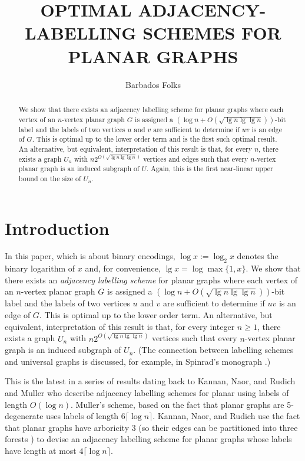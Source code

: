 \documentclass[kpfonts]{patmorin}
\title{\MakeUppercase{Optimal Adjacency-Labelling Schemes for Planar Graphs}}
\author{Barbados Folks}
\begin{document}
\begin{titlepage}
\maketitle

\begin{abstract}
  We show that there exists an adjacency labelling scheme for planar graphs where each vertex of an $n$-vertex planar graph $G$ is assigned a $(\log n+O(\sqrt{\lg n\lg\lg n}))$-bit label and the labels of two vertices $u$ and $v$ are sufficient to determine if $uv$ is an edge of $G$.  This is optimal up to the lower order term and is the first such optimal result.  An alternative, but equivalent, interpretation of this result is that, for every $n$, there exists a graph $U_n$ with $n2^{O(\sqrt{\lg n\lg\lg n})}$ vertices and edges such that every $n$-vertex planar graph is an induced subgraph of $U$.  Again, this is the first near-linear upper bound on the size of $U_n$.
\end{abstract}
\end{titlepage}
\tableofcontents

\newpage

\setcounter{page}{0}
\section{Introduction}

In this paper, which is about binary encodings, $\log x:=\log_2 x$ denotes the binary logarithm of $x$ and, for convenience, $\lg x = \log\max\{1,x\}$.  We show that there exists an \emph{adjacency labelling scheme} for planar graphs where each vertex of an $n$-vertex planar graph $G$ is assigned a $(\log n+O(\sqrt{\lg n\lg\lg n}))$-bit label and the labels of two vertices $u$ and $v$ are sufficient to determine if $uv$ is an edge of $G$.  This is optimal up to the lower order term.  An alternative, but equivalent, interpretation of this result is that, for every integer $n\ge 1$, there exists a graph $U_n$ with $n2^{O(\sqrt{\lg n\lg\lg n})}$ vertices such that every $n$-vertex planar graph is an induced subgraph of $U_n$.  (The connection between labelling schemes and universal graphs is discussed, for example, in Spinrad's monograph \cite[Section~2.1]{spinrad:efficient}.) 

This is the latest in a series of results dating back to Kannan, Naor, and Rudich \cite{kannan.naor.ea:implicit0,kannan.naor.ea:implicit} and Muller \cite{muller:local} who describe adjacency labelling schemes for planar using labels of length $O(\log n)$.  Muller's scheme, based on the fact that planar graphs are 5-degenerate uses labels of length $6\lceil\log n\rceil$.  Kannan, Naor, and Rudich use the fact that planar graphs have arboricity 3 (so their edges can be partitioned into three forests \cite{nash-williams:xx}) to devise an adjacency labelling scheme for planar graphs whose labels have length at most $4\lceil\log n\rceil$.  
\end{document}
